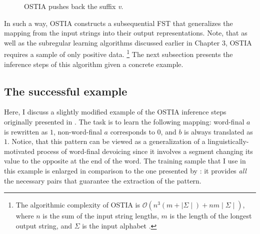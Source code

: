 \begin{figure}[h!] 
\centering
{}
%
\hspace{3em}
%
\caption{OSTIA pushes back the suffix \emph{v}.}
\label{pushbackostia}
\end{figure}


In such a way, OSTIA constructs a subsequential FST that generalizes the mapping from the input strings into their output representations.
Note, that as well as the subregular learning algorithms discussed earlier in Chapter $3$, OSTIA requires a sample of only positive data.%
\footnote{The algorithmic complexity of OSTIA is $\mathcal{O}(n^3(m + \mid\Sigma\mid) + nm\mid\Sigma\mid)$, where $n$ is the sum of the input string lengths, $m$ is the length of the longest output string, and $\Sigma$ is the input alphabet \citep{DeLaHiguera2010}.}
The next subsection presents the inference steps of this algorithm given a concrete example.



\subsection{The successful example}
\label{exam1}

Here, I discuss a slightly modified example of the OSTIA inference steps originally presented in \cite{DeLaHiguera2010}.
The task is to learn the following mapping: word-final $a$ is rewritten as $1$, non-word-final $a$ corresponds to $0$, and $b$ is always translated as $1$.
Notice, that this pattern can be viewed as a generalization of a linguistically-motivated process of word-final devoicing since it involves a segment changing its value to the opposite at the end of the word.
The training sample that I use in this example is enlarged in comparison to the one presented by \cite{DeLaHiguera2010}: it provides \emph{all} the necessary pairs that guarantee the extraction of the pattern.

